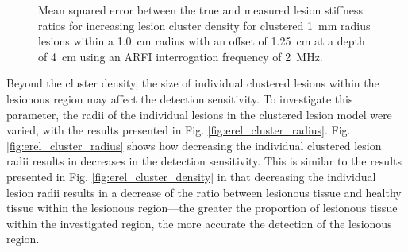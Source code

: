 			\begin{figure}[!htb]
				\centering
				\caption[Shear-wave speed quantified mean squared error related to small lesion cluster density]{Mean squared error between the true and measured lesion stiffness ratios for increasing lesion cluster density for clustered \SI{1}{\mm} radius lesions within a \SI{1.0}{cm} radius with an offset of \SI{1.25}{\cm} at a depth of \SI{4}{\cm} using an ARFI interrogation frequency of \SI{2}{\MHz}.}
				\label{fig:erel_cluster_density_mse}
			\end{figure}

			Beyond the cluster density, the size of individual clustered lesions within the lesionous region may affect the detection sensitivity. To investigate this parameter, the radii of the individual lesions in the clustered lesion model were varied, with the results presented in Fig. \ref{fig:erel_cluster_radius}. Fig. \ref{fig:erel_cluster_radius} shows how decreasing the individual clustered lesion radii results in decreases in the detection sensitivity. This is similar to the results presented in Fig. \ref{fig:erel_cluster_density} in that decreasing the individual lesion radii results in a decrease of the ratio between lesionous tissue and healthy tissue within the lesionous region---the greater the proportion of lesionous tissue within the investigated region, the more accurate the detection of the lesionous region.

